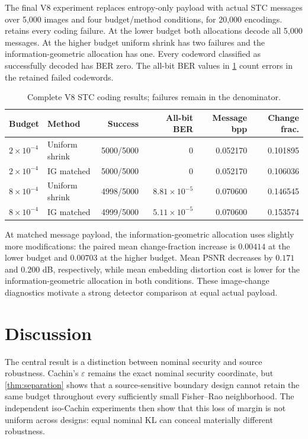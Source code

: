 \documentclass[10pt]{article}
\begin{document}
The final V8 experiment replaces entropy-only payload with actual STC messages over 5,000 images and four budget/method conditions, for 20,000 encodings.  retains every coding failure. At the lower budget both allocations decode all 5,000 messages. At the higher budget uniform shrink has two failures and the information-geometric allocation has one. Every codeword classified as successfully decoded has BER zero. The all-bit BER values in \cref{tab:stc} count errors in the retained failed codewords.

\begin{table}[t]
\centering
\caption{Complete V8 STC coding results; failures remain in the denominator.}
\label{tab:stc}
\small
\begin{tabular}{@{}llrrrr@{}}
\toprule
Budget & Method & Success & All-bit BER & Message bpp & Change frac.\\
\midrule
\(2\times10^{-4}\) & Uniform shrink & 5000/5000 & 0 & 0.052170 & 0.101895\\
\(2\times10^{-4}\) & IG matched & 5000/5000 & 0 & 0.052170 & 0.106036\\
\(8\times10^{-4}\) & Uniform shrink & 4998/5000 & \(8.81\times10^{-5}\) & 0.070600 & 0.146545\\
\(8\times10^{-4}\) & IG matched & 4999/5000 & \(5.11\times10^{-5}\) & 0.070600 & 0.153574\\
\bottomrule
\end{tabular}
\end{table}

At matched message payload, the information-geometric allocation uses slightly more modifications: the paired mean change-fraction increase is \(0.00414\) at the lower budget and \(0.00703\) at the higher budget. Mean PSNR decreases by \(0.171\) and \(0.200\) dB, respectively, while mean embedding distortion cost is lower for the information-geometric allocation in both conditions. These image-change diagnostics motivate a strong detector comparison at equal actual payload.

\section{Discussion}
The central result is a distinction between nominal security and source robustness. Cachin's \(\varepsilon\) remains the exact nominal security coordinate, but \cref{thm:separation} shows that a source-sensitive boundary design cannot retain the same budget throughout every sufficiently small Fisher--Rao neighborhood. The independent iso-Cachin experiments then show that this loss of margin is not uniform across designs: equal nominal KL can conceal materially different robustness.
\end{document}
